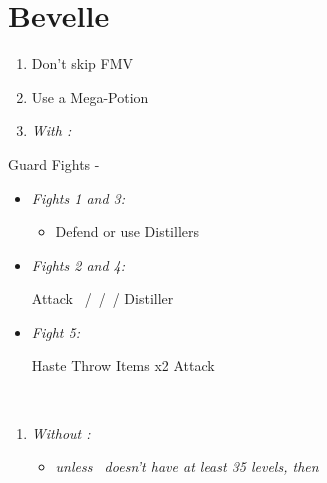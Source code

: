 \chapter{Bevelle}\label{ch:bevelle}

\begin{enumerate}
	\item Don't skip FMV
	\item Use a Mega-Potion
	\item \textit{With \sleepingpowder{}:}
\end{enumerate}
\begin{battle}{Guard Fights - \sleepingpowder}
	\begin{itemize}
		\item \textit{Fights 1 and 3:}
		      \begin{itemize}
			      \tidusf Attack
			      \item Defend or use Distillers
		      \end{itemize}
		\item \textit{Fights 2 and 4:}
		      \begin{itemize}
			      \tidusf Attack
			      \rikkuf \sleepingpowder
			      \kimahrif \bombcore\ /\silencegrenade\ /\smokebomb\ / Distiller\
		      \end{itemize}
		\item \textit{Fight 5:}
		      \begin{itemize}
			      \tidusf Haste \rikku
			      \rikkuf Throw Items x2
			      \tidusf Attack
		      \end{itemize}
	\end{itemize}
\end{battle}
\bothvfill
\lossvfill
\winvfill
\ 
\bothcb
\wincb
\losscb
\ 
\ \bothnewline \winnewline \lossnewline
\begin{enumerate}[resume]
	\item \textit{Without \sleepingpowder{}:}
	      \begin{itemize}
		      \item \formation{\tidus}{\rikku}{\auron} \textit{unless \lulu\ doesn't have at least 35 levels, then } \formation{\tidus}{\rikku}{\lulu}
	      \end{itemize}
\end{enumerate}
